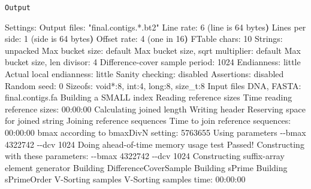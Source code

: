 \documentclass[
  letterpaper,
  DIV=11,
  numbers=noendperiod]{scrartcl}
\newenvironment{Shaded}{\begin{snugshade}}{\end{snugshade}}
\newcommand{\AttributeTok}[1]{\textcolor[rgb]{0.40,0.45,0.13}{#1}}
\newcommand{\ErrorTok}[1]{\textcolor[rgb]{0.68,0.00,0.00}{#1}}
\newcommand{\ExtensionTok}[1]{\textcolor[rgb]{0.00,0.23,0.31}{#1}}
\newcommand{\KeywordTok}[1]{\textcolor[rgb]{0.00,0.23,0.31}{\textbf{#1}}}
\newcommand{\NormalTok}[1]{\textcolor[rgb]{0.00,0.23,0.31}{#1}}
\newcommand{\PreprocessorTok}[1]{\textcolor[rgb]{0.68,0.00,0.00}{#1}}
\newcommand{\StringTok}[1]{\textcolor[rgb]{0.13,0.47,0.30}{#1}}
\begin{document}
\texttt{Output}

\begin{Shaded}
\begin{Highlighting}[]
\ExtensionTok{Settings:}
  \ExtensionTok{Output}\NormalTok{ files: }\StringTok{"final.contigs.*.bt2"}
  \ExtensionTok{Line}\NormalTok{ rate: 6 }\ErrorTok{(}\ExtensionTok{line}\NormalTok{ is 64 bytes}\KeywordTok{)}
  \ExtensionTok{Lines}\NormalTok{ per side: 1 }\ErrorTok{(}\ExtensionTok{side}\NormalTok{ is 64 bytes}\KeywordTok{)}
  \ExtensionTok{Offset}\NormalTok{ rate: 4 }\ErrorTok{(}\ExtensionTok{one}\NormalTok{ in 16}\KeywordTok{)}
  \ExtensionTok{FTable}\NormalTok{ chars: 10}
  \ExtensionTok{Strings:}\NormalTok{ unpacked}
  \ExtensionTok{Max}\NormalTok{ bucket size: default}
  \ExtensionTok{Max}\NormalTok{ bucket size, sqrt multiplier: default}
  \ExtensionTok{Max}\NormalTok{ bucket size, len divisor: 4}
  \ExtensionTok{Difference{-}cover}\NormalTok{ sample period: 1024}
  \ExtensionTok{Endianness:}\NormalTok{ little}
  \ExtensionTok{Actual}\NormalTok{ local endianness: little}
  \ExtensionTok{Sanity}\NormalTok{ checking: disabled}
  \ExtensionTok{Assertions:}\NormalTok{ disabled}
  \ExtensionTok{Random}\NormalTok{ seed: 0}
  \ExtensionTok{Sizeofs:}\NormalTok{ void}\PreprocessorTok{*}\NormalTok{:8, int:4, long:8, size\_t:8}
\ExtensionTok{Input}\NormalTok{ files DNA, FASTA:}
  \ExtensionTok{final.contigs.fa}
\ExtensionTok{Building}\NormalTok{ a SMALL index}
\ExtensionTok{Reading}\NormalTok{ reference sizes}
  \ExtensionTok{Time}\NormalTok{ reading reference sizes: 00:00:00}
\ExtensionTok{Calculating}\NormalTok{ joined length}
\ExtensionTok{Writing}\NormalTok{ header}
\ExtensionTok{Reserving}\NormalTok{ space for joined string}
\ExtensionTok{Joining}\NormalTok{ reference sequences}
  \ExtensionTok{Time}\NormalTok{ to join reference sequences: 00:00:00}
\ExtensionTok{bmax}\NormalTok{ according to bmaxDivN setting: 5763655}
\ExtensionTok{Using}\NormalTok{ parameters }\AttributeTok{{-}{-}bmax}\NormalTok{ 4322742 }\AttributeTok{{-}{-}dcv}\NormalTok{ 1024}
  \ExtensionTok{Doing}\NormalTok{ ahead{-}of{-}time memory usage test}
  \ExtensionTok{Passed!}\NormalTok{  Constructing with these parameters: }\AttributeTok{{-}{-}bmax}\NormalTok{ 4322742 }\AttributeTok{{-}{-}dcv}\NormalTok{ 1024}
\ExtensionTok{Constructing}\NormalTok{ suffix{-}array element generator}
\ExtensionTok{Building}\NormalTok{ DifferenceCoverSample}
  \ExtensionTok{Building}\NormalTok{ sPrime}
  \ExtensionTok{Building}\NormalTok{ sPrimeOrder}
  \ExtensionTok{V{-}Sorting}\NormalTok{ samples}
  \ExtensionTok{V{-}Sorting}\NormalTok{ samples time: 00:00:00}

\end{Highlighting}
\end{Shaded}
\end{document}
